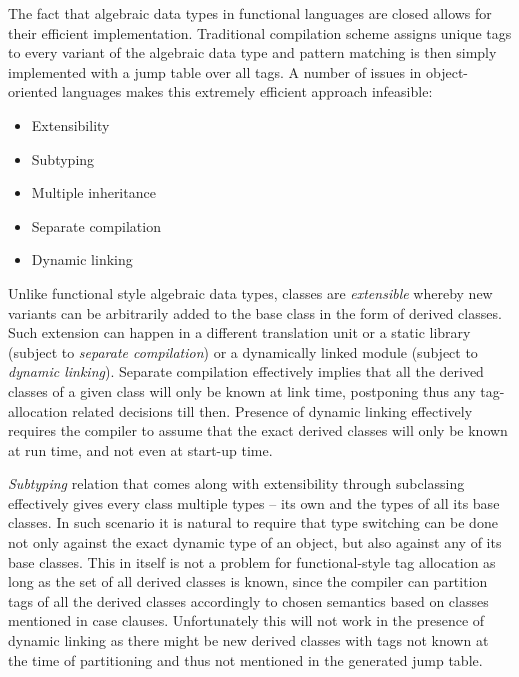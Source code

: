 \documentclass[preprint]{sigplanconf}
\begin{document}
The fact that algebraic data types in functional languages are closed allows for 
their efficient implementation. Traditional compilation scheme assigns unique 
tags to every variant of the algebraic data type and pattern matching is then 
simply implemented with a jump table over all tags. A number of issues in 
object-oriented languages makes this extremely efficient approach infeasible:

\begin{itemize}
\setlength{\itemsep}{0pt}
\setlength{\parskip}{0pt}
\item Extensibility
\item Subtyping
\item Multiple inheritance
\item Separate compilation
\item Dynamic linking 
\end{itemize}

Unlike functional style algebraic data types, classes are \emph{extensible} 
whereby new variants can be arbitrarily added to the base class in the form of 
derived classes. Such extension can happen in a different translation unit or a
static library (subject to \emph{separate compilation}) or a dynamically linked 
module (subject to \emph{dynamic linking}). Separate compilation effectively 
implies that all the derived classes of a given class will only be known at link 
time, postponing thus any tag-allocation related decisions till then.
Presence of dynamic linking effectively requires the compiler to assume that the 
exact derived classes will only be known at run time, and not even at start-up 
time.


\emph{Subtyping} relation that comes along with extensibility through 
subclassing effectively gives every class multiple types -- its own and the 
types of all its base classes. In such scenario it is natural to require that 
type switching can be done not only against the exact dynamic type of an object, 
but also against any of its base classes. This in itself is not a problem for 
functional-style tag allocation as long as the set of all derived classes is 
known, since the compiler can partition tags of all the derived classes 
accordingly to chosen semantics based on classes mentioned in case clauses. 
Unfortunately this will not work in the presence of dynamic linking as there 
might be new derived classes with tags not known at the time of partitioning and 
thus not mentioned in the generated jump table.
\end{document}
